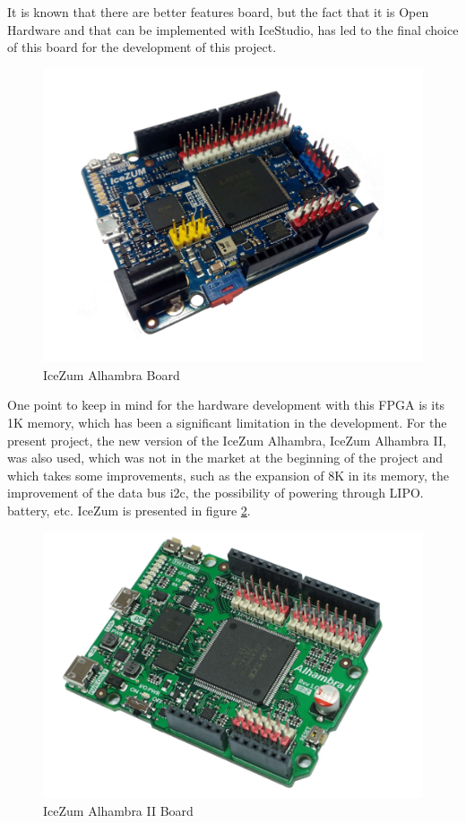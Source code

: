It is known that there are better features board, but the fact that it is Open Hardware and that can be implemented with IceStudio, has led to the final choice of this board for the development of this project.\newline
\begin{center}
\begin{figure}[H]
	\center
	\includegraphics[scale=0.4]{imagenes/EstadoArte/IceZumAlhambra.pdf}
	\caption{IceZum Alhambra Board}
	\label{fig:IceZumAlhambraI}
\end{figure} 
\end{center}
One point to keep in mind for the hardware development with this FPGA is its 1K memory, which has been a significant limitation in the development. For the present project, the new version of the IceZum Alhambra, IceZum Alhambra II, was also used, which was not in the market at the beginning of the project and which takes some improvements, such as the expansion of 8K in its memory, the improvement of the data bus i2c, the possibility of powering through LIPO. battery, etc. IceZum is presented in figure \ref{fig: IceZumAlhambraII}.
\begin{center}
	\begin{figure}[H]
		\center
		\includegraphics[scale=0.5]{imagenes/EstadoArte/IceZumAlhambra.PNG}
		\caption{IceZum Alhambra II Board}
		\label{fig: IceZumAlhambraII}
	\end{figure} 
\end{center}
